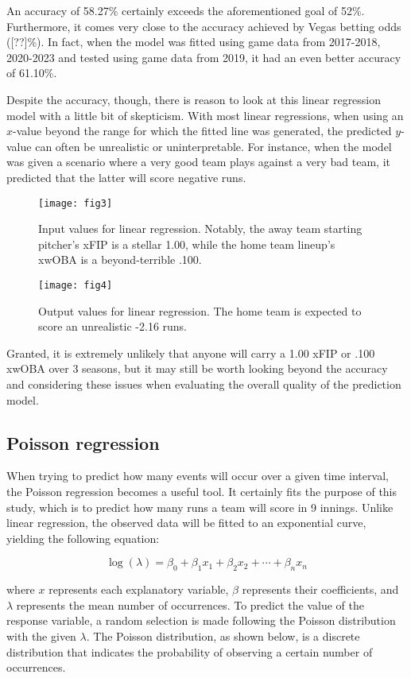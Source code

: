 \documentclass{paper}
\begin{document}
An accuracy of 58.27\% certainly exceeds the aforementioned goal of 52\%. Furthermore, it comes very close to the accuracy achieved by Vegas betting odds ([??]\%). In fact, when the model was fitted using game data from 2017-2018, 2020-2023 and tested using game data from 2019, it had an even better accuracy of 61.10\%.

Despite the accuracy, though, there is reason to look at this linear regression model with a little bit of skepticism. With most linear regressions, when using an $x$-value beyond the range for which the fitted line was generated, the predicted $y$-value can often be unrealistic or uninterpretable. For instance, when the model was given a scenario where a very good team plays against a very bad team, it predicted that the latter will score negative runs.

\begin{figure}[H]
  \centering
  \texttt{[image: fig3]}
  \caption{Input values for linear regression. Notably, the away team starting pitcher's xFIP is a stellar 1.00, while the home team lineup's xwOBA is a beyond-terrible .100.}
  \texttt{[image: fig4]}
  \caption{Output values for linear regression. The home team is expected to score an unrealistic -2.16 runs.}
\end{figure}

Granted, it is extremely unlikely that anyone will carry a 1.00 xFIP or .100 xwOBA over 3 seasons, but it may still be worth looking beyond the accuracy and considering these issues when evaluating the overall quality of the prediction model.

\subsection{Poisson regression}
When trying to predict how many events will occur over a given time interval, the Poisson regression becomes a useful tool. It certainly fits the purpose of this study, which is to predict how many runs a team will score in 9 innings. Unlike linear regression, the observed data will be fitted to an exponential curve, yielding the following equation:

$$\log(\lambda)=\beta_0+\beta_1x_1+\beta_2x_2+\cdots+\beta_nx_n$$

where $x$ represents each explanatory variable, $\beta$ represents their coefficients, and $\lambda$ represents the mean number of occurrences. To predict the value of the response variable, a random selection is made following the Poisson distribution with the given $\lambda$. The Poisson distribution, as shown below, is a discrete distribution that indicates the probability of observing a certain number of occurrences.
\end{document}

